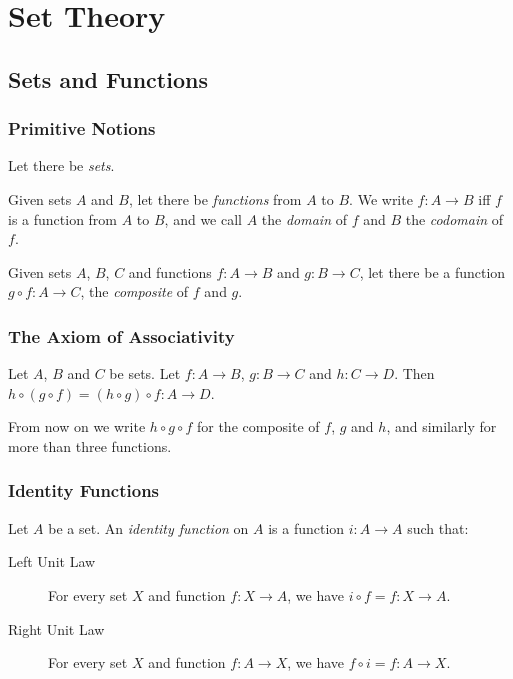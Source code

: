 \newcommand{\ran}{\ensuremath{\operatorname{ran}}}

\chapter{Set Theory}

\section{Sets and Functions}

\subsection{Primitive Notions}

Let there be \emph{sets}.

Given sets $A$ and $B$, let there be \emph{functions} from $A$ to $B$. We
write $f : A \rightarrow B$ iff $f$ is a function from $A$ to $B$, and we call $A$ the \emph{domain} of $f$ and $B$ the \emph{codomain} of $f$.

Given sets $A$, $B$, $C$ and functions $f : A \rightarrow B$ and $g : B \rightarrow C$, let there be
a function $g \circ f : A \rightarrow C$, the \emph{composite} of $f$ and $g$.

\subsection{The Axiom of Associativity}

\begin{ax}
  Let $A$, $B$ and $C$ be sets.
  Let $f : A \rightarrow B$, $g : B \rightarrow C$ and $h : C \rightarrow D$.
  Then $h \circ (g \circ f) = (h \circ g) \circ f : A \rightarrow D$.
\end{ax}

From now on we write $h \circ g \circ f$ for the composite of $f$, $g$ and
$h$, and similarly for more than three functions.

\subsection{Identity Functions}

\begin{df}
  Let $A$ be a set. An \emph{identity function} on $A$ is a function $i : A \rightarrow A$ such that:
  \begin{description}
  \item[Left Unit Law]
  For every set $X$ and function $f : X \rightarrow A$, we have $i \circ f = f : X \rightarrow A$.
  \item[Right Unit Law]
  For every set $X$ and function $f : A \rightarrow X$, we have $f \circ i = f : A \rightarrow X$.
  \end{description}
\end{df}

